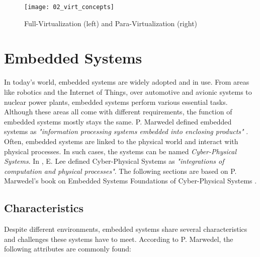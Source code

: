             \begin{figure}[ht]
                \begin{center} 
                    \texttt{[image: 02\_virt\_concepts]} 
                    \caption[Full-Virtualization and Para-Virtualization]{Full-Virtualization (left)  and Para-Virtualization (right)}
                    \label{figure:full_para_virtualization}
                \end{center}	
             \end{figure}

        
    \section{Embedded Systems}
    \label{section:embedded}
    
        In today's world, embedded systems are widely adopted and in use.
        From areas like robotics and the Internet of Things, over automotive and avionic systems to nuclear power plants, embedded systems perform various essential tasks.
        Although these areas all come with different requirements, the function of embedded systems mostly stays the same.
        P. Marwedel defined embedded systems as \textsl{"information processing systems embedded into enclosing products"} \cite{Marwedel2018}.
        Often, embedded systems are linked to the physical world and interact with physical processes.
        In such cases, the systems can be named \textsl{Cyber-Physical Systems}. 
        In \cite{Lee2007}, E. Lee defined Cyber-Physical Systems as \textsl{"integrations of computation and physical processes"}.
        The following sections are based on P. Marwedel's book on Embedded Systems Foundations of Cyber-Physical Systems \cite{Marwedel2018}.
        
        
        \subsection{Characteristics}
        \label{subsection:characteristics}
        
            Despite different environments, embedded systems share several characteristics and challenges these systems have to meet.
            According to P. Marwedel, the following attributes are commonly found:
            
